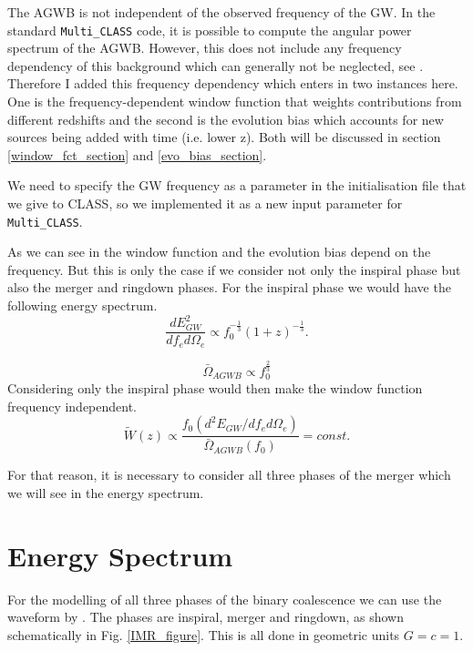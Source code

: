 The AGWB is not independent of the observed frequency of the GW. In the standard 
{\tt Multi\_CLASS} code, it is possible to compute the angular power spectrum of the AGWB. However, this does not include any frequency dependency of this background which can generally not be neglected, see \cite{dallarmi_dipole_2022}. Therefore I added this frequency dependency which enters in two instances here. One is the frequency-dependent window function that weights contributions from different redshifts and the second is the evolution bias which accounts for new sources being added with time (i.e. lower z). Both will be discussed in section \ref{window_fct_section} and \ref{evo_bias_section}.

We need to specify the GW frequency as a parameter in the initialisation file that we give to CLASS, so we implemented it as a new input parameter for {\tt Multi\_CLASS}.

As we can see in \cite{dallarmi_dipole_2022} the window function and the evolution bias 
depend on the frequency. But this is only the case if we consider not only the
inspiral phase but also the merger and ringdown phases. For the inspiral phase we would have the following energy spectrum.
\begin{equation}
    \frac{dE^2_{GW}}{df_e d\Omega_e} \propto f_0^{-\frac{1}{3}}(1+z)^{-\frac{1}{3}} .
\end{equation}

\begin{equation}
    \bar{\Omega}_{AGWB}\propto f_0^{\frac{2}{3}}
\end{equation}
Considering only the inspiral phase would then make the window function frequency independent.
\begin{equation}
    \tilde{W}(z)\propto \frac{f_0(d^2 E_{GW}/df_e d\Omega_e)}{\bar{\Omega}_{AGWB}(f_0)} = const.
\end{equation}

For that reason, it is necessary to consider all three phases of the merger which we will see in the energy spectrum.


\section{Energy Spectrum}


For the modelling of all three phases of the binary coalescence we can use the waveform by \cite{ajith_inspiral-merger-ringdown_2011}. The phases are inspiral, merger and ringdown, as shown schematically in Fig. \ref{IMR_figure}. This is all done in geometric units $G=c=1$.

